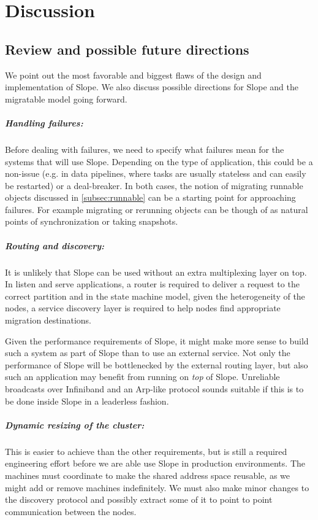 \chapter{Discussion}
\label{chap:discussionfuture}

\section{Review and possible future directions}
We point out the most favorable and biggest flaws of the design and
implementation of Slope. We also discuss possible directions for Slope
and the migratable model going forward.

\paragraph{Handling failures:}
Before dealing with failures, we need to specify what failures mean for the
    systems that will use Slope. Depending on the type of application,
    this could be a non-issue (e.g. in data pipelines, where tasks are
    usually stateless and can easily be restarted) or a deal-breaker.
    In both cases, the notion of migrating runnable objects discussed in
    \autoref{subsec:runnable} can be a starting point for approaching failures.
    For example migrating or rerunning objects can be though of as natural
    points of synchronization or taking snapshots.


\paragraph{Routing and discovery:}
It is unlikely that Slope can be used without an extra multiplexing
layer on top. In listen and serve applications, a router is required to deliver
a request to the correct partition and in the state machine model,
given the heterogeneity of the nodes, a service discovery layer is
required to help nodes find appropriate migration destinations.

Given the
performance requirements of Slope, it might make more sense to build such
a system as part of Slope than to use an external service. Not only the
performance of Slope will be bottlenecked by the external routing layer, but
also such an application may benefit from running on \emph{top} of Slope.
Unreliable broadcasts over Infiniband and an Arp-like protocol sounds suitable
if this is to be done inside Slope in a leaderless fashion.



\paragraph{Dynamic resizing of the cluster:}
This is easier to achieve than the other requirements, but is still a required
engineering effort before we are able use Slope in production environments.
The machines must coordinate to make the shared address space reusable, as we
might add or remove machines indefinitely. We must also make minor changes to
the discovery protocol and possibly extract some of it to point to point
communication between the nodes.



